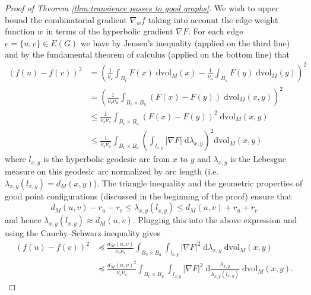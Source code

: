 \documentclass{amsart}
\newcommand{\dd}{\mathrm{d}}
\theoremstyle{plain}
\numberwithin{equation}{section}
\theoremstyle{definition}
\begin{document}
\begin{proof}[Proof of Theorem \ref{thm:transience passes to good graphs}]
We wish to upper bound the combinatorial gradient $\nabla_w f$  taking into account the edge weight function $w$ in terms of the hyperbolic gradient $\nabla F$. For each edge $e = \{u,v\} \in E(G)$ we have by Jensen's inequality (applied on the third line) and by the fundamental theorem of calculus (applied on the bottom line) that
\begin{align*} ( f(u) - f(v))^2 &= \left( \frac{1}{\nu_v} \int_{B_v} F(x) \; \mathrm{dvol}_{M}(x) - \frac{1}{\nu_u}  \int_{B_u} F(y) \; \mathrm{dvol}_{M}(y)\right)^2 \\
&= \left( \frac{1}{\nu_v \nu_u } \int_{B_v \times B_u} \left( F(x) - F(y) \right) \; \mathrm{dvol}_{M}(x,y)  \right)^2 \\
&\le \frac{1}{ \nu_v \nu_u }
 \int_{B_v \times B_u}
\left(  F(x) -  F(y) \right)^2 \;  \mathrm{dvol}_{M}(x,y)  \\ 
&\le \frac{1}{ \nu_v \nu_u }
\int_{B_v \times B_u}
\left(\int_{l_{x,y}}   |\nabla F| \; \dd \lambda_{x,y} \right)^2 \mathrm{d} \mathrm{vol}_M(x,y)
\end{align*}
where $l_{x,y}$ is the hyperbolic geodesic arc from $x $ to $y$ and  $\lambda_{x,y}$ is the Lebesgue measure on this geodesic arc normalized by arc length (i.e. $\lambda_{x,y}(l_{x,y}) = d_M(x,y)$). %
The triangle inequality and the geometric properties of good point configurations (discussed in the beginning of the proof) ensure that  
$$  d_M(u,v)-r_u-r_v \le \lambda_{x,y}(l_{x,y})  \le d_M(u,v) + r_u + r_v $$
and hence $\lambda_{x,y}(l_{x,y}) \approx d_M(u,v)$.
Plugging this into the above expression and using the Cauchy--Schwarz inequality
gives
\begin{align*}
( f(u) - f(v))^2  &\preceq  \frac{d_M(u,v)}{\nu_v \nu_u} \int_{B_v \times B_u}
 \int_{l_{x,y}} |\nabla F|^2 \; \dd \lambda_{x,y}  \; \mathrm{d} \mathrm{vol}_M(x,y) \\
 &\preceq \frac{d_M(u,v)^2}{\nu_v \nu_u } \int_{B_v \times B_u}
 \int_{l_{x,y}} |\nabla F|^2 \; \dd \frac{\lambda_{x,y}}{\lambda_{x,y}(l_{x,y})}  \; \mathrm{d} \mathrm{vol}_M(x,y).
 \end{align*}
 

\end{proof}
\end{document}
